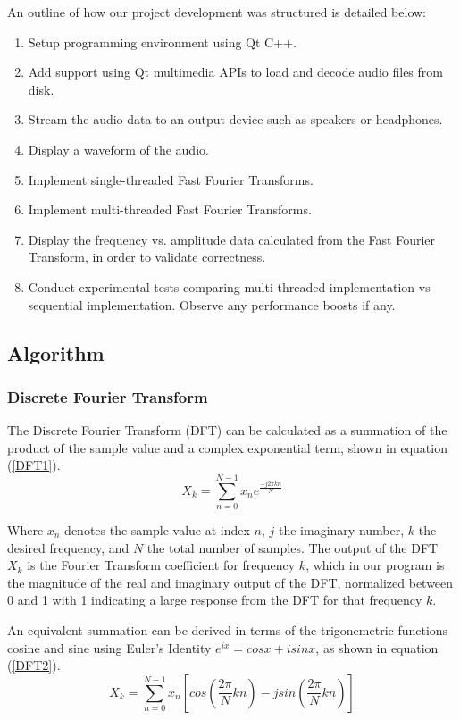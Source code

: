 \documentclass[journal]{IEEEtran}
\begin{document}
\par{
	An outline of how our project development was structured is detailed below:
}
\begin{enumerate}
	\item Setup programming environment using Qt C++.
	\item Add support using Qt multimedia APIs to load and decode audio files from disk.
	\item Stream the audio data to an output device such as speakers or headphones.
	\item Display a waveform of the audio.
	\item Implement single-threaded Fast Fourier Transforms.
	\item Implement multi-threaded Fast Fourier Transforms.
	\item Display the frequency vs. amplitude data calculated from the Fast Fourier Transform, in order to validate correctness.
	\item Conduct experimental tests comparing multi-threaded implementation vs sequential implementation. 
Observe any performance boosts if any.
\end{enumerate}

\subsection{Algorithm}
	 
\subsubsection{Discrete Fourier Transform}
	\par{
		The Discrete Fourier Transform (DFT) can be calculated as 
		a summation of the product of the sample value and a complex
		exponential term, shown in equation (\ref{DFT1}).
	}
		\begin{equation}\label{DFT1}
			\displaystyle X_k = 
			\sum_{n=0}^{N-1}x_ne^{\displaystyle\frac{-j2 \pi kn}{N}}
		\end{equation}
	\par{
		Where $x_n$ denotes the sample value at index $n$, $j$ the imaginary
		number, $k$ the desired frequency, and $N$ the total number of samples.
		The output of the DFT $X_k$ is the Fourier Transform coefficient for
		frequency $k$, which in our program is the magnitude of the real 
		and imaginary output of the DFT, normalized between 0 and 1 with 1
		indicating a large response from the DFT for that frequency $k$.
	}
	\par{
		An equivalent summation can be derived in terms of the trigonemetric
		functions cosine and sine using Euler's Identity $e^{ix}=cosx + isinx$,
		as shown in equation (\ref{DFT2}).
	}
		\begin{equation}\label{DFT2}
			\displaystyle X_k = \sum_{n=0}^{N-1}x_n[cos(\frac{2\pi}{N}kn) 
			- jsin(\frac{2\pi}{N}kn)]
		\end{equation}
\end{document}
